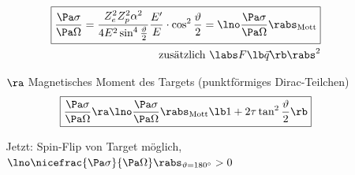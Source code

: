 \begin{itemize}
\begin{itemize}
\begin{align}
\boxed{ \frac{\Pa \sigma}{\Pa \Omega} = \frac{Z_e^2 Z_p^2 \alpha^2 }{4 E^2 \sin^4 \frac{\vartheta}{2}} \frac{E^\prime}{E} \cdot \cos^2 \frac{\vartheta}{2} = \lno \frac{\Pa \sigma}{\Pa \Omega}\rabs_\mathrm{Mott} }\\
\text{zusätzlich } \labs F\lb \vec{q}\rb  \rabs^2
\end{align}
\item[$\ra$] Magnetisches Moment des Targets (punktförmiges Dirac-Teilchen)
\begin{align}
\boxed{ \frac{\Pa \sigma}{\Pa \Omega} \ra \lno \frac{\Pa \sigma}{\Pa \Omega}\rabs_\mathrm{Mott}  \lb  1 + 2 \tau \tan^2 \frac{\vartheta}{2}\rb  }
\end{align}
Jetzt: Spin-Flip von Target möglich, $\lno \nicefrac{\Pa \sigma}{\Pa \Omega} \rabs_{\vartheta = 180^\circ} > 0$
\end{itemize}
\end{itemize}

